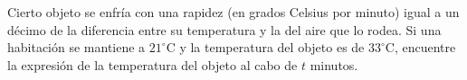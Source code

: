 \item Cierto objeto se enfría con una rapidez (en grados Celsius por minuto) igual a un décimo de la diferencia entre su temperatura y la del aire que lo rodea. Si una habitación se mantiene a $21^\circ\text{C}$ y la temperatura del objeto es de $33^\circ\text{C}$, encuentre la expresión de la temperatura del objeto al cabo de $t$ minutos.
